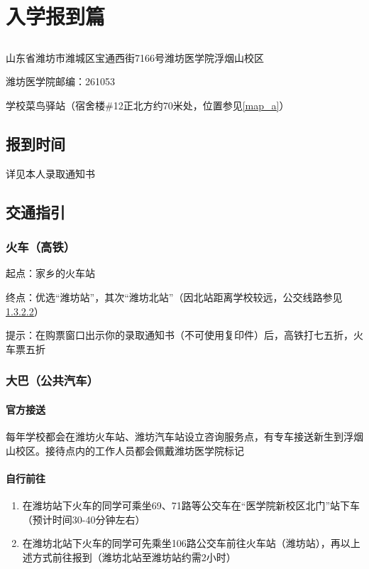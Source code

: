 \chapter[入学报到篇]{入学报到篇}
\section[报到地址（也是快递地址）]{}
山东省潍坊市潍城区宝通西街7166号潍坊医学院浮烟山校区

潍坊医学院邮编：261053

学校菜鸟驿站（宿舍楼\#12正北方约70米处，位置参见\uline{\ref{map_a}}）

\section[报到时间]{报到时间}
详见本人录取通知书

\section[交通指引]{交通指引}
\subsection[火车（高铁）]{火车（高铁）}
起点：家乡的火车站

终点：优选“潍坊站”，其次“潍坊北站”（因北站距离学校较远，公交线路参见\uline{\ref{bus}}）

提示：在购票窗口出示你的录取通知书（不可使用复印件）后，高铁打七五折，火车票五折

\subsection[大巴（公共汽车）]{大巴（公共汽车）}

\subsubsection[官方接送]{官方接送}
每年学校都会在潍坊火车站、潍坊汽车站设立咨询服务点，有专车接送新生到浮烟山校区。接待点内的工作人员都会佩戴潍坊医学院标记

\subsubsection[自行前往]{自行前往}
\label{bus}
\begin{enumerate}
      \item 在潍坊站下火车的同学可乘坐69、71路等公交车在“医学院新校区北门”站下车（预计时间30-40分钟左右）
      \item 在潍坊北站下火车的同学可先乘坐106路公交车前往火车站（潍坊站），再以上述方式前往报到（潍坊北站至潍坊站约需2小时）
\end{enumerate}

